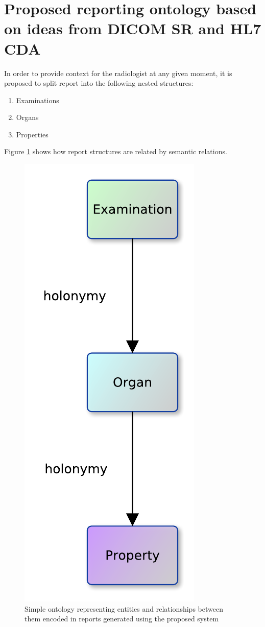 \documentclass[12pt, twoside, openany]{report}
\theoremstyle{definition}
\begin{document}
\section{Proposed reporting ontology based on ideas from DICOM SR and HL7 CDA}
In order to provide context for the radiologist at any given moment, it is proposed to split report into the following nested structures:
\begin{enumerate}
    \item Examinations 
    \item Organs 
    \item Properties 
\end{enumerate}
Figure \ref{fig:report-semantic} shows how report structures are related by semantic relations.
\begin{figure}
    \centering
    \includegraphics{report-semantic.pdf}
    \caption{Simple ontology representing entities and relationships between them encoded in reports generated using the proposed system
    \label{fig:report-semantic}}
\end{figure}
\end{document}
